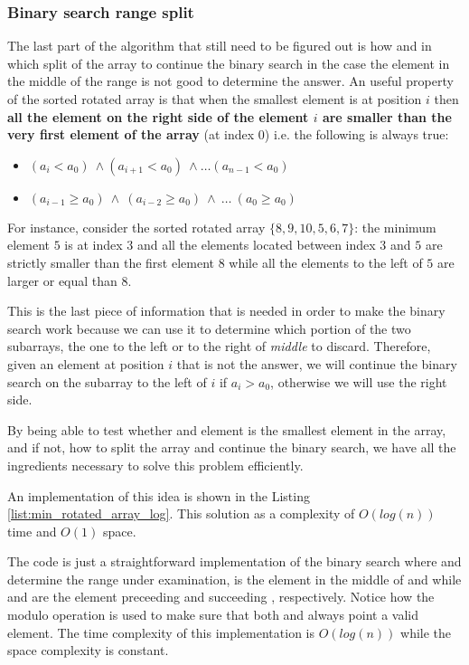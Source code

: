 \subsubsection{Binary search range split}
The last part of the algorithm that still need to be figured out is how and in which split of the array to continue the binary search in the case the element in the middle of the range is not good to determine the answer. An useful property of the sorted rotated array is that when the smallest element is at position $i$ then \textbf{all the element on the right side of the element $i$ are smaller than the very first element of the array }(at index $0$) i.e. the following is always true:
\begin{itemize}
	\item $	(a_i < a_0) \: \wedge (a_{i+1} < a_0) \: \wedge \ldots (a_{n-1} < a_0) $
	\item $	(a_{i-1} \geq a_0) \: \wedge \: (a_{i-2} \geq a_0) \: \wedge \: \ldots \: (a_{0} \geq a_0) $
\end{itemize}
For instance, consider the sorted rotated array $\{8,9,10,5,6,7\}$: the minimum element $5$ is at index $3$ and all the elements located between index $3$ and $5$ are strictly smaller than the first element $8$ while all the elements to the left of $5$ are larger or equal than $8$.

This is the last piece of information that is needed in order to make the binary search work because we can use it to determine which portion of the two subarrays, the one to the left or to the right of \textit{middle} to discard. Therefore, given an element at position $i$ that is not the answer, we will continue the binary search on the subarray to the left of $i$ if $a_i > a_0$, otherwise we will use the right side.

By being able to test whether and element is the smallest element in the array, and if not, how to split the array and continue the binary search, we have all the ingredients necessary to solve this problem efficiently.

An implementation of this idea is shown in the Listing \ref{list:min_rotated_array_log}. This solution as a complexity of $O(log(n))$ time and $O(1)$ space.



The code is just a straightforward implementation of the binary search where  and  determine the range under examination,  is the element in the middle of  and  while  and  are the element preceeding and succeeding , respectively. Notice how the modulo operation is used to make sure that both  and  always point a valid element. The time complexity of this implementation is $O(log(n))$ while the space complexity is constant. 
